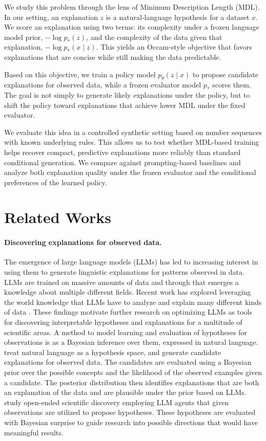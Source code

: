 \documentclass{article}
\theoremstyle{plain}
\theoremstyle{definition}
\theoremstyle{remark}
\begin{document}
We study this problem through the lens of Minimum Description Length (MDL). In our setting, an explanation $z$ is a natural-language hypothesis for a dataset $x$. We score an explanation using two terms: its complexity under a frozen language model prior, $-\log p_*(z)$, and the complexity of the data given that explanation, $-\log p_*(x \mid z)$. This yields an Occam-style objective that favors explanations that are concise while still making the data predictable.

Based on this objective, we train a policy model $p_\theta(z \mid x)$ to propose candidate explanations for observed data, while a frozen evaluator model $p_*$ scores them. The goal is not simply to generate likely explanations under the policy, but to shift the policy toward explanations that achieve lower MDL under the fixed evaluator.

We evaluate this idea in a controlled synthetic setting based on number sequences with known underlying rules. This allows us to test whether MDL-based training helps recover compact, predictive explanations more reliably than standard conditional generation. We compare against prompting-based baselines and analyze both explanation quality under the frozen evaluator and the conditional preferences of the learned policy.

\section{Related Works}

\paragraph{Discovering explanations for observed data.}

The emergence of large language models (LLMs) has led to increasing interest in using them to generate linguistic explanations for patterns observed in data. LLMs are trained on massive amounts of data and through that emerges a knowledge about multiple different fields. Recent work has explored leveraging the world knowledge that LLMs have to analyze and explain many different kinds of data \citep{Singh2024Rethinking, Bordt2024Data, Zhao2023Explainability}. These findings motivate further research on optimizing LLMs as tools for discovering interpretable hypotheses and explanations for a multitude of scientific areas. A method to model learning and evaluation of hypotheses for observations is as a Bayesian inference over them, expressed in natural language. \citet{ellis_2342342523} treat natural language as a hypothesis space, and generate candidate explanations for observed data. The candidates are evaluated using a Bayesian prior over the possible concepts and the likelihood of the observed examples given a candidate. The posterior distribution then identifies explanations that are both an explanation of the data and are plausible under the prior based on LLMs. \citet{agarwal2026autodiscoveryopenendedscientificdiscovery} study open-ended scientific discovery employing LLM agents that given observations are utilized to propose hypotheses. These hypotheses are evaluated with Bayesian surprise to guide research into possible directions that would have meaningful results. 
\end{document}
